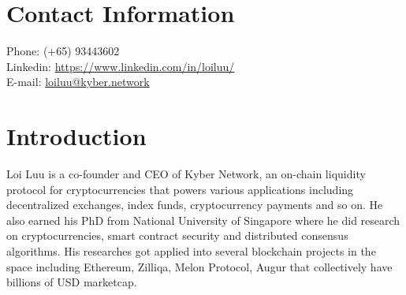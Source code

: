 \documentclass[margin,line]{res}
\begin{document}

\begin{resume}
\section{\sc Contact Information}
\vspace{.05in}
{Phone: } (+65) 93443602 \\            
{ Linkedin:} \href{https://www.linkedin.com/in/loiluu/}{https://www.linkedin.com/in/loiluu/}\\         
{ E-mail:}  \href{mailto:loiluu@kyber.network}{\textsf{loiluu@kyber.network}} \\       


\section{\sc Introduction}
Loi Luu is a co-founder and CEO of Kyber Network, an on-chain liquidity protocol for cryptocurrencies that powers various applications including decentralized exchanges, index funds, cryptocurrency payments and so on. He also earned his PhD from National University of Singapore where he did research on cryptocurrencies, smart contract security and distributed consensus algorithms. His researches got applied into several blockchain projects in the space including Ethereum, Zilliqa, Melon Protocol, Augur that collectively have billions of USD marketcap.


\end{resume}
\end{document}

